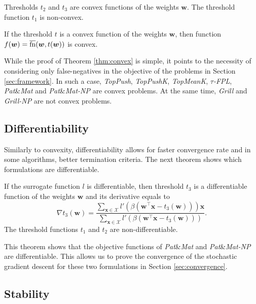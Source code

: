 \documentclass{Thesis}
\newcommand{\Xc}{\mathcal{X}}
\newcommand{\TopPush}{\emph{TopPush}\xspace}
\newcommand{\TopPushK}{\emph{TopPushK}\xspace}
\newcommand{\tauFPL}{{\emph{$\tau$-FPL}}\xspace}
\newcommand{\TopMeanK}{\emph{TopMeanK}\xspace}
\newcommand{\PatMat}{\emph{Pat}\&\emph{Mat}\xspace}
\newcommand{\PatMatNP}{{\emph{Pat}\&\emph{Mat-NP}}\xspace}
\newcommand{\Grill}{\emph{Grill}\xspace}
\newcommand{\GrillNP}{\emph{Grill-NP}\xspace}
\newcommand{\fns}{\overline{\textnormal{fn}}}
\begin{document}
\begin{proposition}\label{prop:convex}
  Thresholds $t_2$ and $t_3$ are convex functions of the weights $\bm{w}$. The threshold function $t_1$ is non-convex.
\end{proposition}

\begin{theorem}\label{thm:convex}
  If the threshold $t$ is a convex function of the weights $\bm{w}$, then function $f(\bm{w}) = \fns(\bm{w}, t(\bm{w}))$ is convex.
\end{theorem}

While the proof of Theorem \ref{thm:convex} is simple, it points to the necessity of considering only false-negatives in the objective of the problems in Section \ref{sec:framework}. In such a case, \TopPush, \TopPushK, \TopMeanK, \tauFPL, \PatMat and \PatMatNP are convex problems. At the same time, \Grill and \GrillNP are not convex problems.


\subsection{Differentiability}

Similarly to convexity, differentiability allows for faster convergence rate and in some algorithms, better termination criteria. The next theorem shows which formulations are differentiable.

\begin{theorem}\label{thm:derivative}
  If the surrogate function $l$ is differentiable, then threshold $t_3$ is a differentiable function of the weights $\bm{w}$ and its derivative equals to
  \begin{equation*}
    \nabla t_3(\bm{w}) = \frac{\sum_{\bm{x} \in \Xc} l'(\beta(\bm{w}^\top \bm{x} - t_3(\bm{w})))\bm{x}}{\sum_{\bm{x} \in \Xc}l'(\beta(\bm{w}^\top \bm{x} - t_3(\bm{w})))}.
  \end{equation*}
  The threshold functions $t_1$ and $t_2$ are non-differentiable.
\end{theorem}

\noindent This theorem shows that the objective functions of \PatMat and \PatMatNP are differentiable. This allows us to prove the convergence of the stochastic gradient descent for these two formulations in Section \ref{sec:convergence}.


\subsection{Stability}\label{sec:stability}
\end{document}
